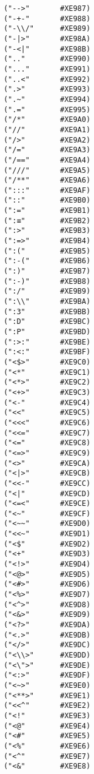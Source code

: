 \documentclass[11pt]{article}
\begin{document}
\begin{verbatim}
            ("-->"       #XE987)
            ("-+-"       #XE988)
            ("-\\/"      #XE989)
            ("-|>"       #XE98A)
            ("-<|"       #XE98B)
            (".."        #XE990)
            ("..."       #XE991)
            ("..<"       #XE992)
            (".>"        #XE993)
            (".~"        #XE994)
            (".="        #XE995)
            ("/*"        #XE9A0)
            ("//"        #XE9A1)
            ("/>"        #XE9A2)
            ("/="        #XE9A3)
            ("/=="       #XE9A4)
            ("///"       #XE9A5)
            ("/**"       #XE9A6)
            (":::"       #XE9AF)
            ("::"        #XE9B0)
            (":="        #XE9B1)
            (":≡"        #XE9B2)
            (":>"        #XE9B3)
            (":=>"       #XE9B4)
            (":("        #XE9B5)
            (":-("       #XE9B6)
            (":)"        #XE9B7)
            (":-)"       #XE9B8)
            (":/"        #XE9B9)
            (":\\"       #XE9BA)
            (":3"        #XE9BB)
            (":D"        #XE9BC)
            (":P"        #XE9BD)
            (":>:"       #XE9BE)
            (":<:"       #XE9BF)
            ("<$>"       #XE9C0)
            ("<*"        #XE9C1)
            ("<*>"       #XE9C2)
            ("<+>"       #XE9C3)
            ("<-"        #XE9C4)
            ("<<"        #XE9C5)
            ("<<<"       #XE9C6)
            ("<<="       #XE9C7)
            ("<="        #XE9C8)
            ("<=>"       #XE9C9)
            ("<>"        #XE9CA)
            ("<|>"       #XE9CB)
            ("<<-"       #XE9CC)
            ("<|"        #XE9CD)
            ("<=<"       #XE9CE)
            ("<~"        #XE9CF)
            ("<~~"       #XE9D0)
            ("<<~"       #XE9D1)
            ("<$"        #XE9D2)
            ("<+"        #XE9D3)
            ("<!>"       #XE9D4)
            ("<@>"       #XE9D5)
            ("<#>"       #XE9D6)
            ("<%>"       #XE9D7)
            ("<^>"       #XE9D8)
            ("<&>"       #XE9D9)
            ("<?>"       #XE9DA)
            ("<.>"       #XE9DB)
            ("</>"       #XE9DC)
            ("<\\>"      #XE9DD)
            ("<\">"      #XE9DE)
            ("<:>"       #XE9DF)
            ("<~>"       #XE9E0)
            ("<**>"      #XE9E1)
            ("<<^"       #XE9E2)
            ("<!"        #XE9E3)
            ("<@"        #XE9E4)
            ("<#"        #XE9E5)
            ("<%"        #XE9E6)
            ("<^"        #XE9E7)
            ("<&"        #XE9E8)

\end{verbatim}
\end{document}
